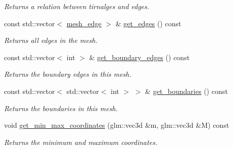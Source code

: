 \begin{DoxyCompactItemize}
\begin{DoxyCompactList}\small\item\em Returns a relation between tirnalges and edges. \end{DoxyCompactList}\item 
const std\+::vector$<$ \hyperlink{classgeoproc_1_1mesh__edge}{mesh\+\_\+edge} $>$ \& \hyperlink{classgeoproc_1_1TriangleMesh_a742e5769cb3e26303eb8ec1af57c9ac4}{get\+\_\+edges} () const
\begin{DoxyCompactList}\small\item\em Returns all edges in the mesh. \end{DoxyCompactList}\item 
const std\+::vector$<$ int $>$ \& \hyperlink{classgeoproc_1_1TriangleMesh_a0cf960fcf069954b51ce567304359d4e}{get\+\_\+boundary\+\_\+edges} () const
\begin{DoxyCompactList}\small\item\em Returns the boundary edges in this mesh. \end{DoxyCompactList}\item 
const std\+::vector$<$ std\+::vector$<$ int $>$ $>$ \& \hyperlink{classgeoproc_1_1TriangleMesh_a07a91ab963592c2560eec6409194ba66}{get\+\_\+boundaries} () const
\begin{DoxyCompactList}\small\item\em Returns the boundaries in this mesh. \end{DoxyCompactList}\item 
void \hyperlink{classgeoproc_1_1TriangleMesh_a24b47dc9303c49a9d20da7a1df188b50}{get\+\_\+min\+\_\+max\+\_\+coordinates} (glm\+::vec3d \&m, glm\+::vec3d \&M) const
\begin{DoxyCompactList}\small\item\em Returns the minimum and maximum coordinates. \end{DoxyCompactList}\end{DoxyCompactItemize}
